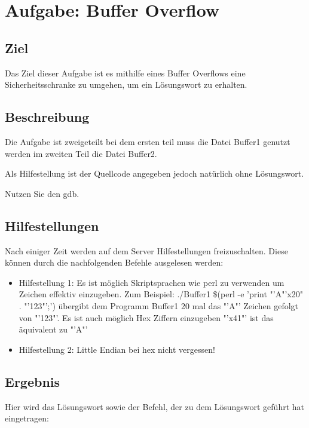 \chapter{Aufgabe: Buffer Overflow}

\section{Ziel}
Das Ziel dieser Aufgabe ist es mithilfe eines Buffer Overflows eine Sicherheitsschranke zu umgehen, um ein Lösungswort zu erhalten.


\section{Beschreibung}
Die Aufgabe ist zweigeteilt bei dem ersten teil muss die Datei Buffer1 genutzt werden im zweiten Teil die Datei Buffer2.

Als Hilfestellung ist der Quellcode angegeben jedoch natürlich ohne Lösungswort. 

Nutzen Sie den gdb.

\section{Hilfestellungen}
Nach einiger Zeit werden auf dem Server Hilfestellungen freizuschalten. Diese können durch die nachfolgenden Befehle ausgelesen werden:

\begin{itemize}
\item Hilfestellung 1: Es ist möglich Skriptsprachen wie perl zu verwenden um Zeichen effektiv einzugeben. Zum Beispiel: ./Buffer1 \$(perl -e 'print "'A"'x20" . "'123"';') übergibt dem Programm Buffer1 20 mal das "'A"' Zeichen gefolgt von "'123"'. Es ist auch möglich Hex Ziffern einzugeben "'x41"' ist das äquivalent zu "'A"'
\item Hilfestellung 2: Little Endian bei hex nicht vergessen!
\end{itemize}

\section{Ergebnis}
Hier wird das Lösungswort sowie der Befehl, der zu dem Lösungswort geführt hat eingetragen: 
